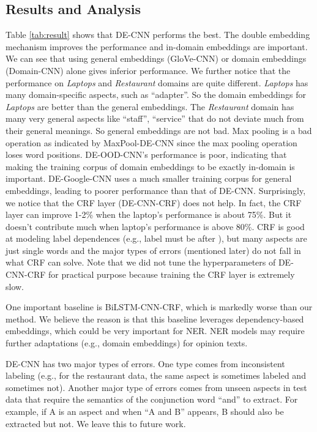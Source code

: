 \documentclass[11pt,a4paper]{article}
\begin{document}
\subsection{Results and Analysis}
Table \ref{tab:result} shows that DE-CNN performs the best. 
The double embedding mechanism improves the performance and in-domain embeddings are important. 
We can see that using general embeddings (GloVe-CNN) or domain embeddings (Domain-CNN) alone gives inferior performance. 
We further notice that the performance on \textit{Laptops} and \textit{Restaurant} domains are quite different. 
\textit{Laptops} has many domain-specific aspects, such as ``adapter''. 
So the domain embeddings for \textit{Laptops} are better than the general embeddings. 
The \textit{Restaurant} domain has many very general aspects like ``staff'', ``service'' that do not deviate much from their general meanings. 
So general embeddings are not bad. 
Max pooling is a bad operation as indicated by MaxPool-DE-CNN since the max pooling operation loses word positions.
DE-OOD-CNN's performance is poor, indicating that making the training corpus of domain embeddings to be exactly in-domain is important.
DE-Google-CNN uses a much smaller training corpus for general embeddings, leading to poorer performance than that of DE-CNN.
Surprisingly, we notice that the CRF layer (DE-CNN-CRF) does not help.
In fact, the CRF layer can improve 1-2\% when the laptop's performance is about 75\%.
But it doesn't contribute much when laptop's performance is above 80\%. 
CRF is good at modeling label dependences (e.g., label  must be after ), but many aspects are just single words and the major types of errors (mentioned later) do not fall in what CRF can solve.
Note that we did not tune the hyperparameters of DE-CNN-CRF for practical purpose because training the CRF layer is extremely slow. 

One important baseline is BiLSTM-CNN-CRF, which is markedly worse than our method. 
We believe the reason is that this baseline leverages dependency-based embeddings\cite{levy2014dependency}, 
which could be very important for NER.
NER models may require further adaptations (e.g., domain embeddings) for opinion texts. 

DE-CNN has two major types of errors.
One type comes from inconsistent labeling (e.g., for the restaurant data, the same aspect is sometimes labeled and sometimes not). 
Another major type of errors comes from unseen aspects in test data that require the semantics of the conjunction word ``and'' to extract. For example, if A is an aspect and when ``A and B'' appears, B should also be extracted but not.
We leave this to future work.
\end{document}

